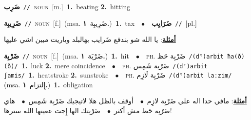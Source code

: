 \documentclass[10pt,a4paper,twoside]{article} %
\begin{document}
\begin{multicols}{2}
{{{{{{{{{{{\setlength\topsep{0pt}\textbf{\foreignlanguage{arabic}{ضَرِب}}\ {\color{gray}\texttt{//}\color{black}}\ \textsc{noun}\ [m.]\ \textbf{1.}~beating  \textbf{2.}~hitting\ 

{\setlength\topsep{0pt}\textbf{\foreignlanguage{arabic}{ضَرِيبِة}}\ {\color{gray}\texttt{//}\color{black}}\ \textsc{noun}\ [f.]\ \color{gray}(msa. \foreignlanguage{arabic}{ضَرِيبِة}~\foreignlanguage{arabic}{\textbf{١.}})\color{black}\ \textbf{1.}~tax\ \ $\bullet$\ \ \setlength\topsep{0pt}\textbf{\foreignlanguage{arabic}{ضَرَايِب}}\ {\color{gray}\texttt{//}\color{black}}\ [pl.]\  \begin{flushright}\color{gray}\foreignlanguage{arabic}{\textbf{\underline{\foreignlanguage{arabic}{أمثلة}}}: يا الله شو بندفع ضَرايب بهالبلد وياريت مبين اشي عليها}\end{flushright}\color{black}} \vspace{2mm}

{\setlength\topsep{0pt}\textbf{\foreignlanguage{arabic}{ضَرْبِة}}\ {\color{gray}\texttt{//}\color{black}}\ \textsc{noun}\ [f.]\ \color{gray}(msa. \foreignlanguage{arabic}{ضَرْبَة}~\foreignlanguage{arabic}{\textbf{١.}})\color{black}\ \textbf{1.}~hit\ \ $\bullet$\ \ \textsc{ph.} \color{gray} \foreignlanguage{arabic}{ضَرْبِة حَظ}\color{black}\ {\color{gray}\texttt{/{\sffamily (dˤ)arbit ħa(ð)(ð)}/}\color{black}}\ \textbf{1.}~luck  \textbf{2.}~mere coincidence\ \ $\bullet$\ \ \textsc{ph.} \color{gray} \foreignlanguage{arabic}{ضَرْبِة شَمِس}\color{black}\ {\color{gray}\texttt{/{\sffamily (dˤ)arbit ʃamis}/}\color{black}}\ \textbf{1.}~heatstroke  \textbf{2.}~sunstroke\ \ $\bullet$\ \ \textsc{ph.} \color{gray} \foreignlanguage{arabic}{ضَرْبِة لَازِم}\color{black}\ {\color{gray}\texttt{/{\sffamily (dˤ)arbit laːzim}/}\color{black}}\ \color{gray} (msa. \foreignlanguage{arabic}{إِلتزام}~\foreignlanguage{arabic}{\textbf{١.}})\color{black}\ \textbf{1.}~obligation\  \begin{flushright}\color{gray}\foreignlanguage{arabic}{\textbf{\underline{\foreignlanguage{arabic}{أمثلة}}}: مافي حدا اله علي ضَرْبِة لازِم\ $\bullet$\ \  أوقف بالظل هلا لاتيجيك ضَرْبِة شَمِس\ $\bullet$\ \  هاي ضَرْبِة حَظ مش أكثر\ $\bullet$\ \  ضَرْبِتك الها إِجت ععينها الله سترها!}\end{flushright}\color{black}} \vspace{2mm}

}}}}}}}}}}}
\end{multicols}
\end{document}
